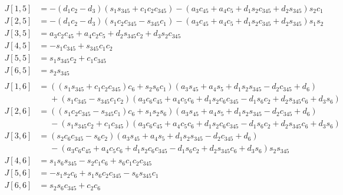 \documentclass{article}
\begin{document}
\begin{align*}
J[1,5] &= - \left(d_{1} c_{2} - d_{3}\right) \left(s_{1} s_{345} + c_{1} c_{2} c_{345}\right) - \left(a_{3} c_{45} + a_{4} c_{5} + d_{1} s_{2} c_{345} + d_{2} s_{345}\right) s_{2} c_{1} \\
J[2,5] &= - \left(d_{1} c_{2} - d_{3}\right) \left(s_{1} c_{2} c_{345} - s_{345} c_{1}\right) - \left(a_{3} c_{45} + a_{4} c_{5} + d_{1} s_{2} c_{345} + d_{2} s_{345}\right) s_{1} s_{2} \\
J[3,5] &= a_{3} c_{2} c_{45} + a_{4} c_{2} c_{5} + d_{2} s_{345} c_{2} + d_{3} s_{2} c_{345} \\
J[4,5] &= - s_{1} c_{345} + s_{345} c_{1} c_{2} \\
J[5,5] &= s_{1} s_{345} c_{2} + c_{1} c_{345} \\
J[6,5] &= s_{2} s_{345} \\
\\
J[1,6] &= \left(\left(s_{1} s_{345} + c_{1} c_{2} c_{345}\right) c_{6} + s_{2} s_{6} c_{1}\right) \left(a_{3} s_{45} + a_{4} s_{5} + d_{1} s_{2} s_{345} - d_{2} c_{345} + d_{6}\right) \\
       &\phantom{=} + \left(s_{1} c_{345} - s_{345} c_{1} c_{2}\right) \left(a_{3} c_{6} c_{45} + a_{4} c_{5} c_{6} + d_{1} s_{2} c_{6} c_{345} - d_{1} s_{6} c_{2} + d_{2} s_{345} c_{6} + d_{3} s_{6}\right) \\
J[2,6] &= \left(\left(s_{1} c_{2} c_{345} - s_{345} c_{1}\right) c_{6} + s_{1} s_{2} s_{6}\right) \left(a_{3} s_{45} + a_{4} s_{5} + d_{1} s_{2} s_{345} - d_{2} c_{345} + d_{6}\right) \\
       &\phantom{=} - \left(s_{1} s_{345} c_{2} + c_{1} c_{345}\right) \left(a_{3} c_{6} c_{45} + a_{4} c_{5} c_{6} + d_{1} s_{2} c_{6} c_{345} - d_{1} s_{6} c_{2} + d_{2} s_{345} c_{6} + d_{3} s_{6}\right) \\
J[3,6] &= \left(s_{2} c_{6} c_{345} - s_{6} c_{2}\right) \left(a_{3} s_{45} + a_{4} s_{5} + d_{1} s_{2} s_{345} - d_{2} c_{345} + d_{6}\right) \\
       &\phantom{=} - \left(a_{3} c_{6} c_{45} + a_{4} c_{5} c_{6} + d_{1} s_{2} c_{6} c_{345} - d_{1} s_{6} c_{2} + d_{2} s_{345} c_{6} + d_{3} s_{6}\right) s_{2} s_{345} \\
J[4,6] &= s_{1} s_{6} s_{345} - s_{2} c_{1} c_{6} + s_{6} c_{1} c_{2} c_{345} \\
J[5,6] &= - s_{1} s_{2} c_{6} + s_{1} s_{6} c_{2} c_{345} - s_{6} s_{345} c_{1} \\
J[6,6] &= s_{2} s_{6} c_{345} + c_{2} c_{6} \\

\end{align*}
\end{document}

